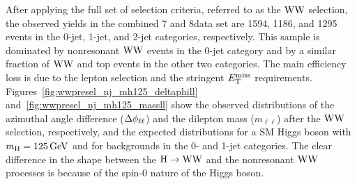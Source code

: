 \documentclass[11pt,twoside,a4paper,cmspaper,final,collab]{cms-tdr}
\begin{document}
After applying the full set of selection criteria,  referred to as the $\mathrm{W}\mathrm{W}$ selection,
the observed yields in the combined 7 and 8\TeV data set are 1594, 1186, and
1295 events in the 0-jet, 1-jet, and 2-jet categories, respectively. This sample is
dominated by nonresonant $\mathrm{W}\mathrm{W}$ events in the 0-jet category and by a
similar fraction of $\mathrm{W}\mathrm{W}$ and top events in the other two categories.
The main efficiency loss is due to the
lepton selection and the stringent $E_{\mathrm{T}}^{\text{miss}}$ requirements.
Figures~\ref{fig:wwpresel_nj_mh125_deltaphill} and~\ref{fig:wwpresel_nj_mh125_massll}
show the observed distributions of the azimuthal angle difference ($\Delta\phi_{\ell\ell}$) and
the dilepton mass ($m_{\ell\ell}$) after the $\mathrm{W}\mathrm{W}$ selection,
respectively, and the expected distributions for a SM Higgs boson with $m_{\mathrm{H}}=125\,\text{Ge\hspace{-.08em}V}$
and for backgrounds in the 0- and 1-jet categories. The clear difference in
the shape between the $\mathrm{H} \to \mathrm{W}\mathrm{W}$ and the nonresonant $\mathrm{W}\mathrm{W}$
processes is because of the spin-0 nature of the Higgs boson.
\end{document}
